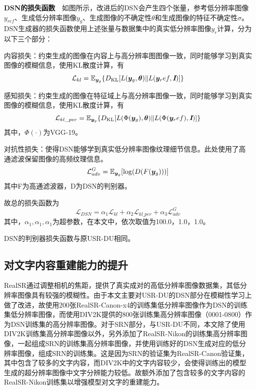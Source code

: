 \noindent\textbf{DSN的损失函数}\ \ 如图所示，改进后的DSN会产生四个张量，参考低分辨率图像$y_{ref}$、生成低分辨率图像$y_g$、生成图像的不确定性$\theta$和生成图像的特征不确定性$\sigma$。DSN生成器的损失函数使用上述张量与数据集中的真实低分辨率图像$y_r$计算，分为以下三个部分：

内容损失：约束生成的图像在内容上与高分辨率图图像一致，同时能够学习到真实图像的模糊信息，使用KL散度计算，有
\begin{equation}
    \mathcal{L}_{kl}=\mathbb{E}_{\vb*{y}_g}\{D_{\text{KL}}[L(\vb*{y}_g,\bm{\theta})\|L(\vb*{y}_ref,\textbf{\em I})]\}
\end{equation}

感知损失：约束生成的图像在特征域上与高分辨率图像一致，同时能够学习到真实图像的模糊信息，使用KL散度计算，有
\begin{equation}
    \mathcal{L}_{kl\_per}=\mathbb{E}_{\vb*{y}_g}\{D_{\text{KL}}[L(\Phi(\vb*{y}_g),\bm{\theta})\|L(\Phi(\vb*{y}_ref),\textbf{\em I})]\}
\end{equation}
其中，$\Phi(\cdot)$为VGG-19\parencite{simonyan2014very}。

对抗性损失：使得DSN能够学到真实低分辨率图像纹理细节信息。此处使用了高通滤波保留图像的高频纹理信息。
\begin{equation}
    \mathcal{L}_{adv}^G=\mathbb{E}_{\vb*{y}_g}[\log(D(F(\vb*{y}_g)))]
\end{equation}
其中F为高通滤波器，D为DSN的判别器。

故总的损失函数为
\begin{equation}
    \mathcal{L}_{DSN} = \alpha_1\mathcal{L}_{kl}+\alpha_2\mathcal{L}_{kl\_per}+\alpha_3\mathcal{L}_{adv}^G
\end{equation}
其中，$\alpha_1,\alpha_1,\alpha_1$为超参数，在本文中，依次取值为100.0，1.0，1.0。

DSN的判别器损失函数与原USR-DU相同。

\subsection{对文字内容重建能力的提升}
RealSR通过调整相机的焦距，提供了真实成对的高低分辨率图像数据集，其低分辨率图像具有较强的模糊性。由于本文主要对USR-DU的DSN部分在模糊性学习上做了改进，故使用200张RealSR-Canon-x4的训练集低分辨率图像作为DSN的训练集低分辨率图像，而使用DIV2K提供的800张训练集高分辨率图像（0001-0800）作为DSN训练集的高分辨率图像。对于SRN部分，与USR-DU不同，本文除了使用DIV2K训练集高分辨率图像以外，另外添加了RealSR-Nikon的训练集高分辨率图像，一起组成SRN的训练集高分辨率图像，并使用训练好的DSN生成对应的低分辨率图像，组成SRN的训练集。这是因为SRN的验证集为RealSR-Canon验证集，其中包含了较多的文字内容，而DIV2K中的文字内容较少，会使得训练出的模型生成的超分辨率图像中文字分辨能力较低。故额外添加了包含较多的文字内容的RealSR-Nikon训练集以增强模型对文字的重建能力。
